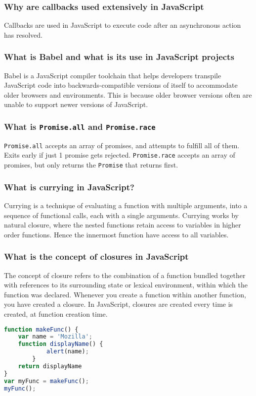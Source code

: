\documentclass[12pt, a4paper]{article}
\newcommand{\code}[1]{\texttt{#1}}
\begin{document}
\subsubsection*{Why are callbacks used extensively in JavaScript}
Callbacks are used in JavaScript to execute code after an asynchronous action has resolved.

\subsubsection*{What is Babel and what is its use in JavaScript projects}
Babel is a JavaScript compiler toolchain that helps developers transpile JavaScript code into backwards-compatible versions of itself to accommodate older browsers and environments.
This is because older browser versions often are unable to support newer versions of JavaScript.

\subsubsection*{What is \code{Promise.all} and \code{Promise.race}}
\code{Promise.all} accepts an array of promises, and attempts to fulfill all of them.
Exits early if just 1 promise gets rejected.\newline
\code{Promise.race} accepts an array of promises, but only returns the \code{Promise} that returns first.

\subsubsection*{What is currying in JavaScript?}
Currying is a technique of evaluating a function with multiple arguments, into a sequence of functional calls, each with a single arguments.\newline
Currying works by natural closure, where the nested functions retain access to variables in higher order functions.
Hence the innermost function have access to all variables.

\subsubsection*{What is the concept of closures in JavaScript}
The concept of closure refers to the combination of a function bundled together with references to its surrounding state or lexical environment, within which the function was declared.
Whenever you create a function within another function, you have created a closure.
In JavaScript, closures are created every time is created, at function creation time.
\begin{mdframed}[backgroundcolor=light-gray, roundcorner=10pt,leftmargin=1, rightmargin=1, innerleftmargin=20, innertopmargin=5,innerbottommargin=5, outerlinewidth=1, linecolor=light-gray]
\begin{lstlisting}[language=JavaScript]
function makeFunc() {
    var name = 'Mozilla';
    function displayName() {
            alert(name);
        }
    return displayName
}
var myFunc = makeFunc();
myFunc();

\end{lstlisting}
\end{mdframed}
\end{document}
